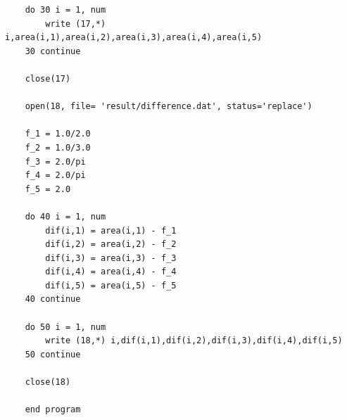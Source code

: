 \documentclass[12pt,a4paper]{jsarticle}
\begin{document}
\begin{lstlisting}
    do 30 i = 1, num
        write (17,*) i,area(i,1),area(i,2),area(i,3),area(i,4),area(i,5)
    30 continue
    
    close(17)
    
    open(18, file= 'result/difference.dat', status='replace')
    
    f_1 = 1.0/2.0
    f_2 = 1.0/3.0
    f_3 = 2.0/pi
    f_4 = 2.0/pi
    f_5 = 2.0
    
    do 40 i = 1, num
        dif(i,1) = area(i,1) - f_1
        dif(i,2) = area(i,2) - f_2
        dif(i,3) = area(i,3) - f_3
        dif(i,4) = area(i,4) - f_4
        dif(i,5) = area(i,5) - f_5
    40 continue
    
    do 50 i = 1, num
        write (18,*) i,dif(i,1),dif(i,2),dif(i,3),dif(i,4),dif(i,5)
    50 continue
    
    close(18)
    
    end program
\end{lstlisting}
\end{document}
